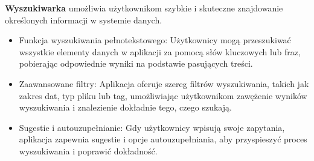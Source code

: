 \documentclass[12pt,a4paper,twoside]{article}
\begin{document}
\textbf{Wyszukiwarka} umożliwia użytkownikom szybkie i skuteczne znajdowanie określonych informacji w systemie danych.
\begin{itemize}
	\item Funkcja wyszukiwania pełnotekstowego: Użytkownicy mogą przeszukiwać wszystkie elementy danych w aplikacji za pomocą słów kluczowych lub fraz, pobierając odpowiednie wyniki na podstawie pasujących treści.
	\item Zaawansowane filtry: Aplikacja oferuje szereg filtrów wyszukiwania, takich jak zakres dat, typ pliku lub tag, umożliwiając użytkownikom zawężenie wyników wyszukiwania i znalezienie dokładnie tego, czego szukają.
	\item Sugestie i autouzupełnianie: Gdy użytkownicy wpisują swoje zapytania, aplikacja zapewnia sugestie i opcje autouzupełniania, aby przyspieszyć proces wyszukiwania i poprawić dokładność.
\end{itemize}
\end{document}
